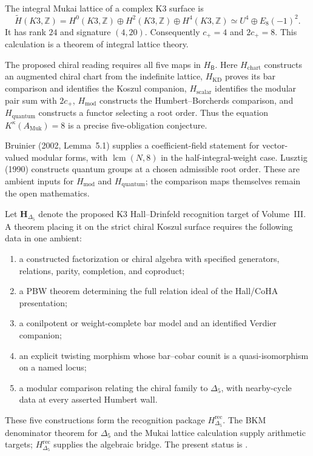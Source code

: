 \begin{remark}
\label{rem:climax-k3-face}
The integral Mukai lattice of a complex K3 surface is
\[
 \widetilde H(K3,\mathbb Z)
 =
 H^0(K3,\mathbb Z)\oplus H^2(K3,\mathbb Z)\oplus H^4(K3,\mathbb Z)
 \simeq U^4\oplus E_8(-1)^2.
\]
It has rank \(24\) and signature \((4,20)\).  Consequently
\(c_+=4\) and \(2c_+=8\).  This calculation is a theorem of integral
lattice theory.

The proposed chiral reading requires all five maps in
\(H_{\mathsf B}\).  Here \(H_{\mathrm{chart}}\) constructs an augmented
chiral chart from the indefinite lattice,
\(H_{\mathrm{KD}}\) proves its bar comparison and identifies the
Koszul companion, \(H_{\mathrm{scalar}}\) identifies the modular pair
sum with \(2c_+\), \(H_{\mathrm{mod}}\) constructs the
Humbert--Borcherds comparison, and \(H_{\mathrm{quantum}}\) constructs
a functor selecting a root order.  Thus the equation
\(K^\kappa(A_{\mathrm{Muk}})=8\) is a precise five-obligation
conjecture.

Bruinier (2002, Lemma~5.1) supplies a coefficient-field statement for
vector-valued modular forms, with \(\operatorname{lcm}(N,8)\) in the
half-integral-weight case.  Lusztig (1990) constructs quantum groups
at a chosen admissible root order.  These are ambient inputs for
\(H_{\mathrm{mod}}\) and \(H_{\mathrm{quantum}}\); the comparison maps
themselves remain the open mathematics.
\end{remark}

\begin{remark}
\label{rem:k3-koszul-structure-precise}
\ClaimStatusOpen
Let \(\mathbf H_{\Delta_5}\) denote the proposed K3
Hall--Drinfeld recognition target of Volume~III.  A theorem placing it
on the strict chiral Koszul surface requires the following data in one
ambient:
\begin{enumerate}[label=\textup{(\alph*)}]
\item a constructed factorization or chiral algebra with specified
generators, relations, parity, completion, and coproduct;
\item a PBW theorem determining the full relation ideal of the
Hall/CoHA presentation;
\item a conilpotent or weight-complete bar model and an identified
Verdier companion;
\item an explicit twisting morphism whose bar--cobar counit is a
quasi-isomorphism on a named locus;
\item a modular comparison relating the chiral family to
\(\Delta_5\), with nearby-cycle data at every asserted Humbert wall.
\end{enumerate}
These five constructions form the recognition package
\(H_{\Delta_5}^{\mathrm{rec}}\).  The BKM denominator theorem for
\(\Delta_5\) and the Mukai lattice calculation supply arithmetic
targets; \(H_{\Delta_5}^{\mathrm{rec}}\) supplies the algebraic bridge.
The present status is \ClaimStatusOpen.
\end{remark}


